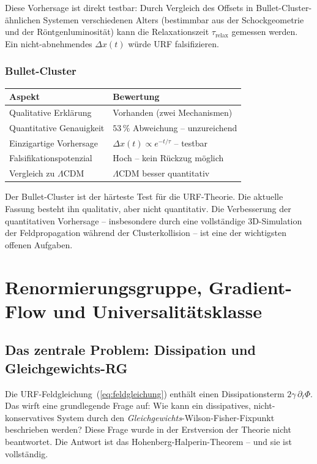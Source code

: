 \documentclass[12pt,a4paper]{article}
\theoremstyle{definition}
\begin{document}
Diese Vorhersage ist direkt testbar: Durch Vergleich des Offsets in
Bullet-Cluster-ähnlichen Systemen verschiedenen Alters (bestimmbar
aus der Schockgeometrie und der Röntgenluminosität) kann die
Relaxationszeit $\tau_{\mathrm{relax}}$ gemessen werden. Ein
nicht-abnehmendes $\Delta x(t)$ würde URF falsifizieren.

\subsubsection{Bullet-Cluster}

\begin{center}
\begin{tabular}{p{5cm}p{7cm}}
\toprule
Aspekt & Bewertung \\
\midrule
Qualitative Erklärung & Vorhanden (zwei Mechanismen) \\
Quantitative Genauigkeit & $53\,\%$ Abweichung -- unzureichend \\
Einzigartige Vorhersage & $\Delta x(t) \propto e^{-t/\tau}$ -- testbar \\
Falsifikationspotenzial & Hoch -- kein Rückzug möglich \\
Vergleich zu $\Lambda$CDM & $\Lambda$CDM besser quantitativ \\
\bottomrule
\end{tabular}
\end{center}

Der Bullet-Cluster ist der härteste Test für die URF-Theorie.
Die aktuelle Fassung besteht ihn qualitativ, aber nicht quantitativ.
Die Verbesserung der quantitativen Vorhersage -- insbesondere durch
eine vollständige 3D-Simulation der Feldpropagation während der
Clusterkollision -- ist eine der wichtigsten offenen Aufgaben.


\section{Renormierungsgruppe, Gradient-Flow und Universalitätsklasse}
\label{sec:rg}

\subsection{Das zentrale Problem: Dissipation und Gleichgewichts-RG}

Die URF-Feldgleichung~(\ref{eq:feldgleichung}) enthält einen
Dissipationsterm $2\gamma\,\partial_t\Phi$. Das wirft eine grundlegende
Frage auf: Wie kann ein dissipatives, nicht-konservatives System durch
den \emph{Gleichgewichts}-Wilson-Fisher-Fixpunkt beschrieben werden?
Diese Frage wurde in der Erstversion der Theorie nicht beantwortet.
Die Antwort ist das Hohenberg-Halperin-Theorem \cite{Hohenberg1977} --
und sie ist vollständig.
\end{document}
